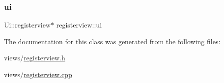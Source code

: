 \mbox{\label{classregisterview_ac8bc2dae39fb31c3bfe66f3c1ca07e59}} 
\subsubsection{\texorpdfstring{ui}{ui}}
{\footnotesize\ttfamily Ui\+::registerview$\ast$ registerview\+::ui\hspace{0.3cm}{\ttfamily [private]}}



The documentation for this class was generated from the following files\+:\begin{DoxyCompactItemize}
\item 
views/\hyperlink{registerview_8h}{registerview.\+h}\item 
views/\hyperlink{registerview_8cpp}{registerview.\+cpp}\end{DoxyCompactItemize}
